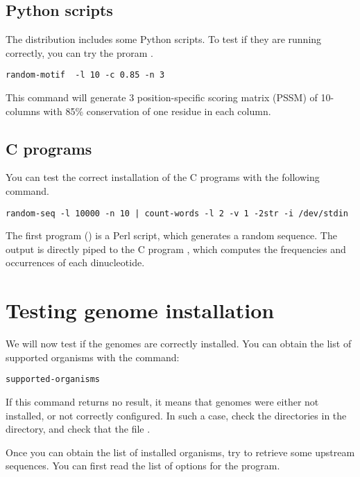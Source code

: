 \subsection{Python scripts}

The \RSAT distribution includes some Python scripts. To test if they
are running correctly, you can try the proram .

\begin{lstlisting}
random-motif  -l 10 -c 0.85 -n 3
\end{lstlisting}

This command will generate 3 position-specific scoring matrix (PSSM)
of 10-columns with 85\% conservation of one residue in each column.

\subsection{C programs}

You can test the correct installation of the C programs with the
following command.

\begin{lstlisting}
random-seq -l 10000 -n 10 | count-words -l 2 -v 1 -2str -i /dev/stdin
\end{lstlisting}

The first program () is a Perl script, which
generates a random sequence. The output is directly piped to the C
program , which computes the frequencies and
occurrences of each dinucleotide.

\section{Testing genome installation}

We will now test if the genomes are correctly installed. You can
obtain the list of supported organisms with the command:

\begin{lstlisting}
supported-organisms
\end{lstlisting}


If this command returns no result, it means that genomes were either
not installed, or not correctly configured. In such a case, check the
directories in the  directory, and check that the
file .

Once you can obtain the list of installed organisms, try to retrieve
some upstream sequences. You can first read the list of options for the
 program.

